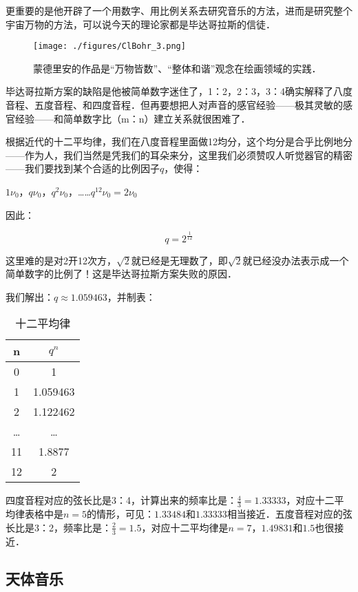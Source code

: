 更重要的是他开辟了一个用数字、用比例关系去研究音乐的方法，进而是研究整个宇宙万物的方法，可以说今天的理论家都是毕达哥拉斯的信徒．

\begin{figure}[ht]
\centering
\texttt{[image: ./figures/ClBohr\_3.png]}
\caption{蒙德里安的作品是“万物皆数”、“整体和谐”观念在绘画领域的实践．} \label{ClBohr_fig3}
\end{figure}

毕达哥拉斯方案的缺陷是他被简单数字迷住了，1：2，2：3，3：4确实解释了八度音程、五度音程、和四度音程．但再要想把人对声音的感官经验——极其灵敏的感官经验——和简单数字比（m：n）建立关系就很困难了．

根据近代的十二平均律，我们在八度音程里面做12均分，这个均分是合乎比例地分——作为人，我们当然是凭我们的耳朵来分，这里我们必须赞叹人听觉器官的精密——我们要找到某个合适的比例因子$q$，使得：

$1 \nu_0$，$q \nu_0$，$q^2 \nu_0$，……$q^{12} \nu_0 =2 \nu_0$

因此：

\begin{equation}
q = 2^{\frac{1}{12}}
\end{equation}

这里难的是对2开12次方，$\sqrt{2}$就已经是无理数了，即$\sqrt{2}$就已经没办法表示成一个简单数字的比例了！这是毕达哥拉斯方案失败的原因．

我们解出：$q \approx 1.059463 $，并制表：

\begin{table}[ht]
\centering
\caption{⼗⼆平均律}\label{ClBohr_tab1}
\begin{tabular}{|c|c|}
\hline
n & $q^n$\\
\hline
0 & 1 \\
\hline
1& 1.059463 \\
\hline
2 & 1.122462 \\
\hline
… & … \\
\hline
11 & 1.8877 \\
\hline
12 & 2 \\
\hline
\end{tabular}
\end{table}


四度音程对应的弦长比是3：4，计算出来的频率比是：$\frac{4}{3} = 1.33333$，对应十二平均律表格中是$n = 5$的情形，可见：$1.33484$和$1.33333$相当接近．五度音程对应的弦长比是3：2，频率比是：$\frac{2}{3} = 1.5$，对应十二平均律是$n=7$，$1.49831$和$1.5$也很接近．

\subsection{天体音乐}

